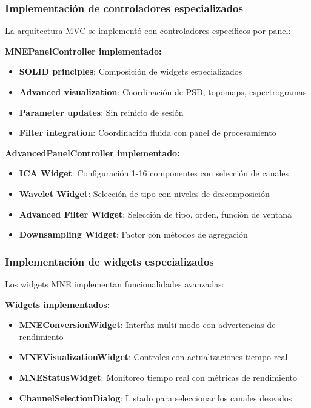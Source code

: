 \subsubsection{Implementación de controladores especializados}

La arquitectura MVC se implementó con controladores específicos por panel:

\textbf{MNEPanelController implementado:}
\begin{itemize}
    \item \textbf{SOLID principles}: Composición de widgets especializados
    \item \textbf{Advanced visualization}: Coordinación de PSD, topomaps, espectrogramas
    \item \textbf{Parameter updates}: Sin reinicio de sesión
    \item \textbf{Filter integration}: Coordinación fluida con panel de procesamiento
\end{itemize}

\textbf{AdvancedPanelController implementado:}
\begin{itemize}
    \item \textbf{ICA Widget}: Configuración 1-16 componentes con selección de canales
    \item \textbf{Wavelet Widget}: Selección de tipo con niveles de descomposición
    \item \textbf{Advanced Filter Widget}: Selección de tipo, orden, función de ventana
    \item \textbf{Downsampling Widget}: Factor con métodos de agregación
\end{itemize}

\subsubsection{Implementación de widgets especializados}

Los widgets MNE implementan funcionalidades avanzadas:

\textbf{Widgets implementados:}
\begin{itemize}
    \item \textbf{MNEConversionWidget}: Interfaz multi-modo con advertencias de rendimiento
    \item \textbf{MNEVisualizationWidget}: Controles con actualizaciones tiempo real
    \item \textbf{MNEStatusWidget}: Monitoreo tiempo real con métricas de rendimiento
    \item \textbf{ChannelSelectionDialog}: Listado para seleccionar los canales deseados
\end{itemize}

